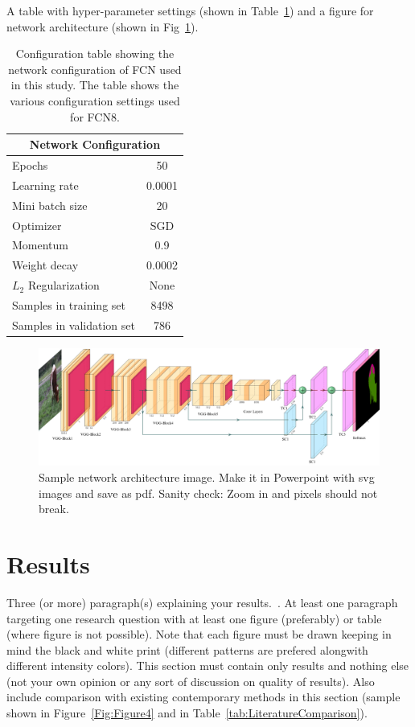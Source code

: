 \documentclass[conference]{IEEEtran}
\begin{document}
A table with hyper-parameter settings (shown in Table~\ref{tab:FCNConfiguration}) and a figure for network architecture (shown in Fig~\ref{Fig:Figure2}).

\begin{table}[!t]
\centering
\caption{Configuration table showing the network configuration of FCN used in this study. The table shows the various configuration settings used for FCN8.}
\label{tab:FCNConfiguration} 
\begin{tabular}{|l|c|}
\hline
\multicolumn{2}{|c|}{\textbf{Network Configuration}} 
\\ \hline
Epochs & 50 \\
Learning rate & 0.0001 \\
Mini batch size & 20 \\ 
Optimizer & SGD \\
Momentum & 0.9 \\
Weight decay & 0.0002 \\
$L_2$ Regularization & None \\
Samples in training set & 8498 \\
Samples in validation set & 786 \\ \hline
\end{tabular}
\end{table}

\begin{figure}[htbp]
\centerline{\includegraphics[width=17.8cm]{Figure2.png}}
\caption{Sample network architecture image. Make it in Powerpoint with svg images and save as pdf. Sanity check: Zoom in and pixels should not break.}
\label{Fig:Figure2}
\end{figure}

\section{Results}
Three (or more) paragraph(s) explaining your results.~\cite{bayesian_vsr_2014}. 
At least one paragraph targeting one research question with at least one figure (preferably) or table (where figure is not possible).
Note that each figure must be drawn keeping in mind the black and white print (different patterns are prefered alongwith different intensity colors).
This section must contain only results and nothing else (not your own opinion or any sort of discussion on quality of results).
Also include comparison with existing contemporary methods in this section (sample shown in Figure~\ref{Fig:Figure4} and in Table~\ref{tab:LiteratureComparison}).
\end{document}
